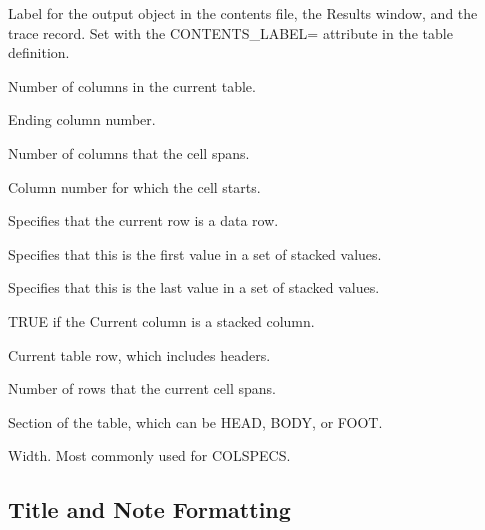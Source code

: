 \begin{description}

Label for the output object in the contents file, the Results window, and the trace record. Set with the CONTENTS\_LABEL= attribute in the table definition.

Number of columns in the current table.

Ending column number.

Number of columns that the cell spans.

Column number for which the cell starts.

Specifies that the current row is a data row.

Specifies that this is the first value in a set of stacked values.

Specifies that this is the last value in a set of stacked values.

TRUE if the Current column is a stacked column.

Current table row, which includes headers.

Number of rows that the current cell spans.

Section of the table, which can be HEAD, BODY, or FOOT.

Width. Most commonly used for COLSPECS.

\end{description}

\subsection{Title and Note Formatting}

